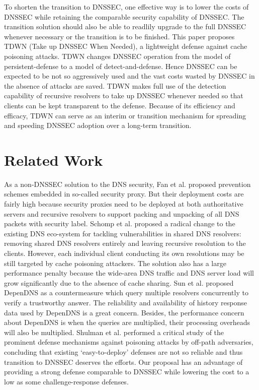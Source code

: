 \documentclass[conference]{IEEEtran}
\begin{document}
To shorten the transition to DNSSEC, one effective way is to lower the costs of DNSSEC while retaining the comparable security capability of DNSSEC. The transition solution should also be able to readlily upgrade to the full DNSSEC whenever necessary or the transition is to be finished.
This paper proposes TDWN (Take up DNSSEC When Needed), a lightweight defense against cache poisoning attacks. TDWN changes DNSSEC operation from the model of persistent-defense to a model of detect-and-defense. Hence DNSSEC can be expected to be not so aggressively used and the vast costs wasted by DNSSEC in the absence of attacks are saved. TDWN makes full use of the detection capability of recursive resolvers to take up DNSSEC whenever needed so that clients can be kept transparent to the defense. Because of its efficiency and efficacy, TDWN can serve as an interim or transition mechanism for spreading and speeding DNSSEC adoption over a long-term transition.

\section{Related Work}

As a non-DNSSEC solution to the DNS security, Fan et al. \cite{Proxy} proposed prevention schemes embedded in so-called security proxy. But their deployment costs are fairly high because security proxies need to be deployed at both authoritative servers and recursive resolvers to support packing and unpacking of all DNS packets with security label. Schomp et al. \cite{Hotnet} proposed a radical change to the existing DNS eco-system for tackling vulnerabilities in shared DNS resolvers: removing shared DNS resolvers entirely and leaving recursive resolution to the clients. However, each individual client conducting its own resolutions may be still targeted by cache poisoning attackers. The solution also has a large performance penalty because the wide-area DNS traffic and DNS server load will grow significantly due to the absence of cache sharing. Sun et al. \cite{DepenDNS} proposed DepenDNS as a countermeasure which query multiple resolvers concurrently to verify a trustworthy answer. The reliability and availability of history response data used by DepenDNS is a great concern. Besides, the performance concern about DepenDNS is when the queries are multiplied, their processing overheads will also be multiplied. Shulman et al. \cite{Shulman} performed a critical study of the prominent defense mechanisms against poisoning attacks by off-path adversaries, concluding that existing `easy-to-deploy' defenses are not so reliable and thus transition to DNSSEC deserves the efforts. Our proposal has an advantage of providing a strong defense comparable to DNSSEC while lowering the cost to a low as some challenge-response defenses.
\end{document}
